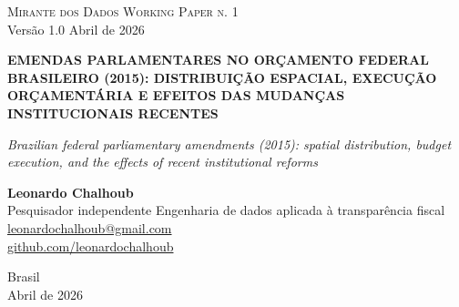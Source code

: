 \documentclass[12pt,a4paper,oneside]{article}
\begin{document}
\begin{titlepage}
  \begin{center}
    \vspace*{1.5cm}
    {\small\textsc{Mirante dos Dados \quad\textbar\quad Working Paper n. 1}}\\
    {\small Versão 1.0 \textemdash{} Abril de 2026}

    \vfill

    {\LARGE\bfseries
     EMENDAS PARLAMENTARES NO ORÇAMENTO FEDERAL BRASILEIRO
     (2015): DISTRIBUIÇÃO ESPACIAL, EXECUÇÃO ORÇAMENTÁRIA
     E EFEITOS DAS MUDANÇAS INSTITUCIONAIS RECENTES}

    \vspace{1cm}
    {\large\itshape
     Brazilian federal parliamentary amendments (2015):
     spatial distribution, budget execution, and the effects of recent
     institutional reforms}

    \vfill

    {\large\textbf{Leonardo Chalhoub}}\\[4pt]
    {\small Pesquisador independente \textemdash{} Engenharia de dados aplicada à transparência fiscal}\\[2pt]
    {\small\href{mailto:leonardochalhoub@gmail.com}{leonardochalhoub@gmail.com}}\\
    {\small\href{https://github.com/leonardochalhoub}{github.com/leonardochalhoub}}

    \vfill

    {\small Brasil \\ Abril de 2026}
  \end{center}
\end{titlepage}

\end{document}
